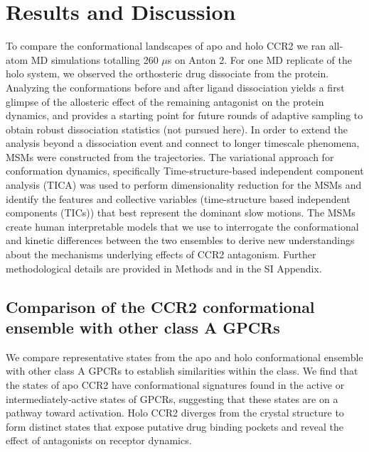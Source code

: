 \documentclass[9pt,twocolumn,twoside]{pnas-new}
\begin{document}
\section*{Results and Discussion}

To compare the conformational landscapes of apo and holo CCR2 we ran all-atom MD simulations totalling 260 $\mu$s on Anton 2\cite{Shaw2014}.
For one MD replicate of the holo system, we observed the orthosteric drug dissociate from the protein.
Analyzing the conformations before and after ligand dissociation yields a first glimpse of the allosteric effect of the remaining antagonist on the protein dynamics, and provides a starting point for future rounds of adaptive sampling to obtain robust dissociation statistics (not pursued here).
In order to extend the analysis beyond a dissociation event and connect to longer timescale phenomena, MSMs were constructed from the trajectories.
The variational approach for conformation dynamics\cite{Noe2013}, specifically Time-structure-based independent component analysis (TICA)\cite{Schwantes2013, Perez-Hernandez2013} was used to perform dimensionality reduction for the MSMs and identify the features and collective variables (time-structure based independent components (TICs)) that best represent the dominant slow motions.
The MSMs create human interpretable models that we use to interrogate the conformational and kinetic differences between the two ensembles to derive new understandings about the mechanisms underlying effects of CCR2 antagonism. 
Further methodological details are provided in Methods and in the SI Appendix. 

\subsection*{Comparison of the CCR2 conformational ensemble with other class A GPCRs}

We compare representative states from the apo and holo conformational ensemble with other class A GPCRs to establish similarities within the class.
We find that the states of apo CCR2 have conformational signatures found in the active or intermediately-active states of GPCRs, suggesting that these states are on a pathway toward activation.
Holo CCR2 diverges from the crystal structure to form distinct states that expose putative drug binding pockets and reveal the effect of antagonists on receptor dynamics.
\end{document}
